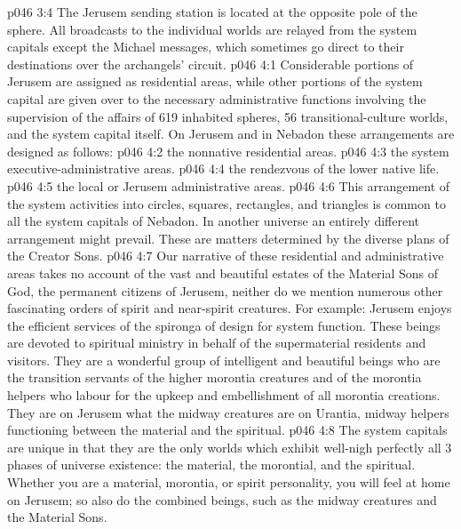 \vs p046 3:4 \pc The Jerusem sending station is located at the opposite pole of the sphere. All broadcasts to the individual worlds are relayed from the system capitals except the Michael messages, which sometimes go direct to their destinations over the archangels’ circuit.
\vs p046 4:1 Considerable portions of Jerusem are assigned as residential areas, while other portions of the system capital are given over to the necessary administrative functions involving the supervision of the affairs of 619 inhabited spheres, 56 transitional\hyp{}culture worlds, and the system capital itself. On Jerusem and in Nebadon these arrangements are designed as follows:
\vs p046 4:2 \bibnobreakspace {} the nonnative residential areas.
\vs p046 4:3 \bibnobreakspace {} the system executive\hyp{}administrative areas.
\vs p046 4:4 \bibnobreakspace {} the rendezvous of the lower native life.
\vs p046 4:5 \bibnobreakspace {} the local or Jerusem administrative areas.
\vs p046 4:6 \pc This arrangement of the system activities into circles, squares, rectangles, and triangles is common to all the system capitals of Nebadon. In another universe an entirely different arrangement might prevail. These are matters determined by the diverse plans of the Creator Sons.
\vs p046 4:7 \pc Our narrative of these residential and administrative areas takes no account of the vast and beautiful estates of the Material Sons of God, the permanent citizens of Jerusem, neither do we mention numerous other fascinating orders of spirit and near\hyp{}spirit creatures. For example: Jerusem enjoys the efficient services of the spironga of design for system function. These beings are devoted to spiritual ministry in behalf of the supermaterial residents and visitors. They are a wonderful group of intelligent and beautiful beings who are the transition servants of the higher morontia creatures and of the morontia helpers who labour for the upkeep and embellishment of all morontia creations. They are on Jerusem what the midway creatures are on Urantia, midway helpers functioning between the material and the spiritual.
\vs p046 4:8 The system capitals are unique in that they are the only worlds which exhibit well\hyp{}nigh perfectly all 3 phases of universe existence: the material, the morontial, and the spiritual. Whether you are a material, morontia, or spirit personality, you will feel at home on Jerusem; so also do the combined beings, such as the midway creatures and the Material Sons.
